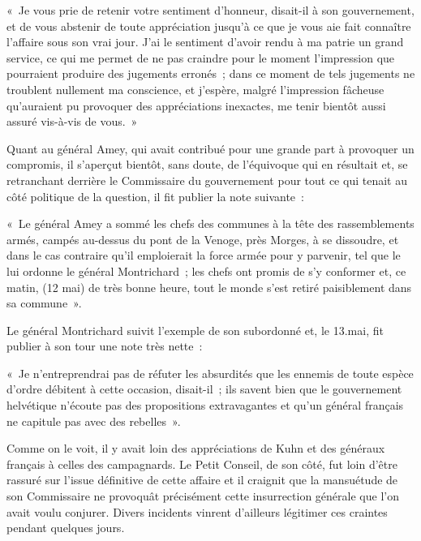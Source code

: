\documentclass[french,twoside]{book} %
\newenvironment{quoteblock}%
  {\begin{quoting}}
  {\end{quoting}}
\newenvironment{quotebar}{%
    \def\FrameCommand{{\color{rubric!10!}\vrule width 0.5em} \hspace{0.9em}}%
    \def\OuterFrameSep{\itemsep} %
    \MakeFramed {\advance\hsize-\width \FrameRestore}
  }%
  {%
    \endMakeFramed
  }
\renewenvironment{quoteblock}%
  {%
    \savenotes
    \setstretch{0.9}
    \normalfont
    \begin{quotebar}
  }
  {%
    \end{quotebar}
    \spewnotes
  }
\begin{document}
\begin{quoteblock}
 \noindent « Je vous prie de retenir votre sentiment d’honneur, disait-il à son gouvernement, et de vous abstenir de toute appréciation jusqu’à ce que je vous aie fait connaître l’affaire sous son vrai jour. J’ai le sentiment d’avoir rendu à ma patrie un grand service, ce qui me permet de ne pas craindre pour le moment l’impression que pourraient produire des jugements erronés ; dans ce moment de tels jugements ne troublent nullement ma conscience, et j’espère, malgré l’impression fâcheuse qu’auraient pu provoquer des appréciations inexactes, me tenir bientôt aussi assuré vis-à-vis de vous. »
 \end{quoteblock}

\noindent Quant au général Amey, qui avait contribué pour une grande part à provoquer un compromis, il s’aperçut bientôt, sans doute, de l’équivoque qui en résultait et, se retranchant derrière le Commissaire du gouvernement pour tout ce qui tenait au côté politique de la question, il fit publier la note suivante :\par

\begin{quoteblock}
 \noindent « Le général Amey a sommé les chefs des communes à la tête des rassemblements armés, campés au-dessus du pont de la Venoge, près Morges, à se dissoudre, et dans le cas contraire qu’il emploierait la force armée pour y parvenir, tel que le lui ordonne le général Montrichard ; les chefs ont promis de s’y conformer et, ce matin, (12 mai) de très bonne heure, tout le monde s’est retiré paisiblement dans sa commune ».
 \end{quoteblock}

\noindent Le général Montrichard suivit l’exemple de son subordonné et, le 13.mai, fit publier à son tour une note très nette :\par

\begin{quoteblock}
 \noindent « Je n’entreprendrai pas de réfuter les absurdités que les ennemis de toute espèce d’ordre débitent à cette occasion, disait-il ; ils savent bien que le gouvernement helvétique n’écoute pas des propositions extravagantes et qu’un général français ne capitule pas avec des rebelles ».
 \end{quoteblock}

\noindent Comme on le voit, il y avait loin des appréciations de Kuhn et des généraux français à celles des campagnards. Le Petit Conseil, de son côté, fut loin d’être rassuré sur l’issue définitive de cette affaire et il craignit que la mansuétude de son Commissaire ne provoquât précisément cette insurrection générale que l’on avait voulu conjurer. Divers incidents vinrent d’ailleurs légitimer ces craintes pendant quelques jours.\par
\end{document}

